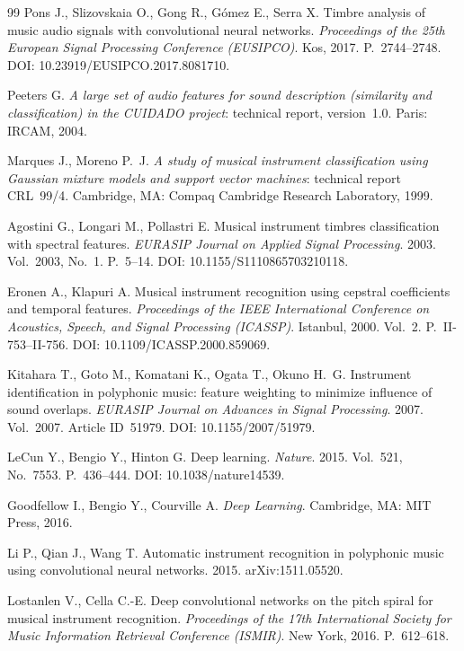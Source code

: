 \begin{thebibliography}{99}
Pons J., Slizovskaia O., Gong R., G{\'o}mez E., Serra X.
Timbre analysis of music audio signals with convolutional neural networks.
\textit{Proceedings of the 25th European Signal Processing Conference (EUSIPCO)}.
Kos, 2017.
P.~2744--2748.
DOI: 10.23919/EUSIPCO.2017.8081710.

Peeters G.
\textit{A large set of audio features for sound description (similarity and classification) in the CUIDADO project}:
technical report, version~1.0.
Paris: IRCAM, 2004.

Marques J., Moreno P.~J.
\textit{A study of musical instrument classification using Gaussian mixture models and support vector machines}:
technical report CRL~99/4.
Cambridge, MA: Compaq Cambridge Research Laboratory, 1999.

Agostini G., Longari M., Pollastri E.
Musical instrument timbres classification with spectral features.
\textit{EURASIP Journal on Applied Signal Processing}.
2003.
Vol.~2003, No.~1.
P.~5--14.
DOI: 10.1155/S1110865703210118.

Eronen A., Klapuri A.
Musical instrument recognition using cepstral coefficients and temporal features.
\textit{Proceedings of the IEEE International Conference on Acoustics, Speech, and Signal Processing (ICASSP)}.
Istanbul, 2000.
Vol.~2.
P.~II-753--II-756.
DOI: 10.1109/ICASSP.2000.859069.

Kitahara T., Goto M., Komatani K., Ogata T., Okuno H.~G.
Instrument identification in polyphonic music: feature weighting to minimize influence of sound overlaps.
\textit{EURASIP Journal on Advances in Signal Processing}.
2007.
Vol.~2007.
Article ID~51979.
DOI: 10.1155/2007/51979.

LeCun Y., Bengio Y., Hinton G.
Deep learning.
\textit{Nature}.
2015.
Vol.~521, No.~7553.
P.~436--444.
DOI: 10.1038/nature14539.

Goodfellow I., Bengio Y., Courville A.
\textit{Deep Learning}.
Cambridge, MA: MIT Press, 2016.

Li P., Qian J., Wang T.
Automatic instrument recognition in polyphonic music using convolutional neural networks.
2015.
arXiv:1511.05520.

Lostanlen V., Cella C.-E.
Deep convolutional networks on the pitch spiral for musical instrument recognition.
\textit{Proceedings of the 17th International Society for Music Information Retrieval Conference (ISMIR)}.
New York, 2016.
P.~612--618.


\end{thebibliography}
